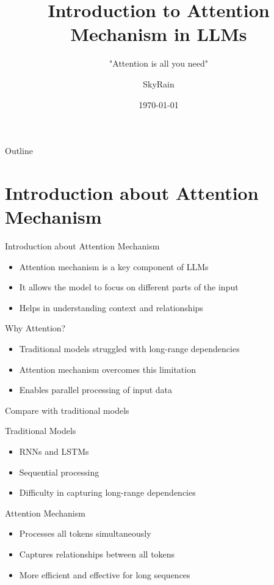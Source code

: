 \documentclass{beamer}
\title{Introduction to Attention Mechanism in LLMs}
\subtitle{"Attention is all you need"}
\institute{Yanshan University}
\author{SkyRain}
\date{\today}
\begin{document}
\begin{frame}
    \titlepage
\end{frame}

\begin{frame}{Outline}
    \tableofcontents
\end{frame}

\section{Introduction about Attention Mechanism}
\begin{frame}{Introduction about Attention Mechanism}
    \begin{itemize}
        \item Attention mechanism is a key component of LLMs
        \item It allows the model to focus on different parts of the input
        \item Helps in understanding context and relationships
    \end{itemize}
    \begin{block}{Why Attention?}
        \begin{itemize}
            \item Traditional models struggled with long-range dependencies
            \item Attention mechanism overcomes this limitation
            \item Enables parallel processing of input data
        \end{itemize}
    \end{block}
\end{frame}

\begin{frame}{Compare with traditional models}
    \begin{block}{Traditional Models}
        \begin{itemize}
            \item RNNs and LSTMs
            \item Sequential processing
            \item Difficulty in capturing long-range dependencies
        \end{itemize}
    \end{block}
    \begin{block}{Attention Mechanism}
        \begin{itemize}
            \item Processes all tokens simultaneously
            \item Captures relationships between all tokens
            \item More efficient and effective for long sequences
        \end{itemize}
    \end{block}
\end{frame}
\end{document}
